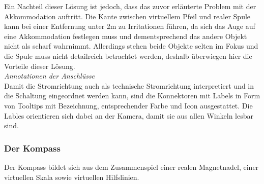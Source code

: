 Ein Nachteil dieser Lösung ist jedoch, dass das zuvor erläuterte Problem mit der Akkommodation auftritt. Die Kante zwischen virtuellem Pfeil und realer Spule kann bei einer Entfernung unter 2m zu Irritationen führen, da sich das Auge auf eine Akkommodation festlegen muss und dementsprechend das andere Objekt nicht als scharf wahrnimmt. Allerdings stehen beide Objekte selten im Fokus und die Spule muss nicht detailreich betrachtet werden, deshalb überwiegen hier die Vorteile dieser Lösung.\\

\textit{Annotationen der Anschlüsse}\\
Damit die Stromrichtung auch als technische Stromrichtung interpretiert und in die Schaltung eingeordnet werden kann, sind die Konnektoren mit Labels in Form von Tooltips mit Bezeichnung, entsprechender Farbe und Icon ausgestattet. Die Lables orientieren sich dabei an der Kamera, damit sie aus allen Winkeln lesbar sind.\\

\subsubsection{Der Kompass} 
\label{sec-4-2-4}
Der Kompass bildet sich aus dem Zusammenspiel einer realen Magnetnadel, einer virtuellen Skala sowie virtuellen Hilfslinien. 

